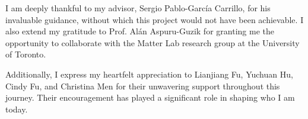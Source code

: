 I am deeply thankful to my advisor, Sergio Pablo-García Carrillo, for his invaluable guidance, without which this project would not have been achievable. I also extend my gratitude to Prof. Alán Aspuru-Guzik for granting me the opportunity to collaborate with the Matter Lab research group at the University of Toronto.

Additionally, I express my heartfelt appreciation to Lianjiang Fu, Yuchuan Hu, Cindy Fu, and Christina Men for their unwavering support throughout this journey. Their encouragement has played a significant role in shaping who I am today.